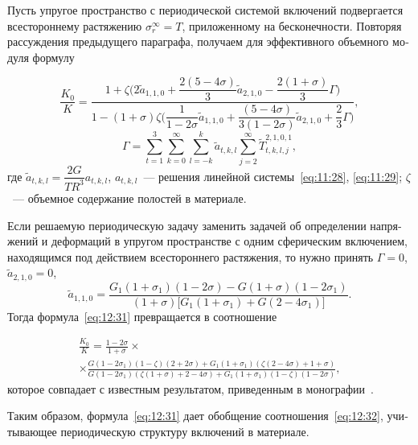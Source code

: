 \begin{russian}
Пусть упругое пространство с периодической системой включений подвергается всестороннему растяжению $\sigma_r^\infty=T$, приложенному на бесконечности. Повторяя рассуждения предыдущего параграфа, получаем для эффективного объемного модуля формулу

\begin{equation}
\frac{K_0}{K}=\frac{1+\zeta\bigg(2 \tilde a_{1,1,0}+\dfrac{2(5-4\sigma)}{3} \tilde a_{2,1,0}-\dfrac{2(1+\sigma)}{3}\Gamma\bigg)}{1-(1+\sigma)\zeta\bigg(\dfrac{1}{1-2\sigma} \tilde a_{1,1,0}+\dfrac{(5-4\sigma)}{3(1-2\sigma)} \tilde a_{2,1,0}+\dfrac{2}{3}\Gamma\bigg)},
\label{eq:12:31}
\end{equation}
$$
\Gamma=\sum\limits_{t=1}^3\sum\limits_{k=0}^\infty\sum\limits_{l=-k}^k \tilde a_{t,k,l}\sum\limits_{j=2}^\infty\tilde T_{t,k,l,j}^{2,1,0,1},
$$
где $\tilde a_{t,k,l}=\dfrac{2G}{TR^3}a_{t,k,l}$, $a_{t,k,l}$~--- решения линейной системы~\eqref{eq:11:28}, \eqref{eq:11:29}; $\zeta$~--- объемное содержание полостей в материале.

Если решаемую периодическую задачу заменить задачей об определении напряжений и деформаций в упругом пространстве с одним сферическим включением, находящимся под действием всестороннего растяжения, то нужно принять $\Gamma=0$, $\tilde a_{2,1,0}=0$,
$$
\tilde a_{1,1,0}=\frac{G_1(1+\sigma_1)(1-2\sigma)-G(1+\sigma)(1-2\sigma_1)}{(1+\sigma)\bigg\lbrack G_1(1+\sigma_1)+G(2-4\sigma_1)\bigg\rbrack}.
$$
Тогда формула~\eqref{eq:12:31} превращается в соотношение

\begin{multline}
\frac{K_0}{K}=\frac{1-2\sigma}{1+\sigma}\times \\
\times\frac{G(1-2\sigma_1)(1-\zeta)(2+2\sigma)+G_1(1+\sigma_1)(\zeta(2-4\sigma)+1+\sigma)}{G(1-2\sigma_1)(\zeta(1+\sigma)+2-4\sigma)+G_1(1+\sigma_1)(1-\zeta)(1-2\sigma)},
\label{eq:12:32}
\end{multline}  
которое совпадает с известным результатом, приведенным в монографии~\cite{Vanin1985}.

Таким образом, формула~\eqref{eq:12:31} дает обобщение соотношения~\eqref{eq:12:32}, учитывающее периодическую структуру включений в материале.


\end{russian}
